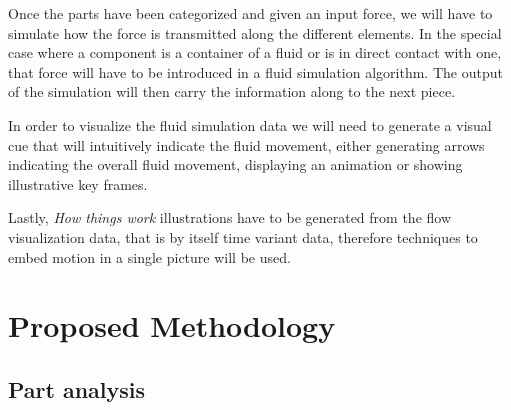 Once the parts have been categorized and given an input force, we will have to simulate how the force is transmitted along the different elements.
In the special case where a component is a container of a fluid or is in direct contact with one, that force will have to be introduced in a fluid simulation algorithm.
The output of the simulation will then carry the information along to the next piece.

In order to visualize the fluid simulation data we will need to generate a visual cue that will intuitively indicate the fluid movement, either generating arrows indicating the overall fluid movement, displaying an animation or showing illustrative key frames.

Lastly, \textit{How things work} illustrations have to be generated from the flow visualization data, that is by itself time variant data, therefore techniques to embed motion in a single picture will be used.


\section{Proposed Methodology}

\subsection{Part analysis}

